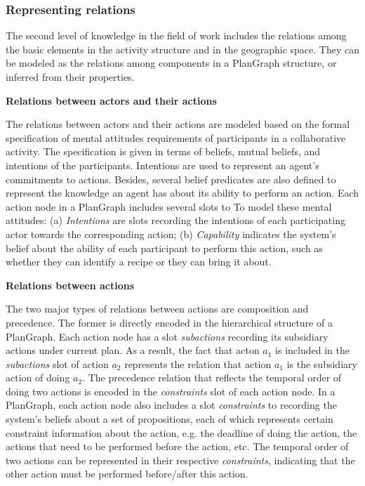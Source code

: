 \subsubsection{Representing relations} %
\label{ssub:representing_relations}
The second level of knowledge in the field of work includes the relations among the basic elements in the activity structure and in the geographic space. They can be modeled as the relations among components in a PlanGraph structure, or inferred from their properties.

\textbf{Relations between actors and their actions}

The relations between actors and their actions are modeled based on the formal specification of mental attitudes requirements of participants in a collaborative activity. The specification is given in terms of beliefs, mutual beliefs, and intentions of the participants. Intentions are used to represent an agent’s commitments to actions. Besides, several belief predicates are also defined to represent the knowledge an agent has about its ability to perform an action. Each action node in a PlanGraph includes several slots to To model these mental attitudes: (a) \emph{Intentions} are slots recording the intentions of each participating actor towards the corresponding action; (b) \emph{Capability} indicates the system’s belief about the ability of each participant to perform this action, such as whether they can identify a recipe or they can bring it about.

\textbf{Relations between actions}

The two major types of relations between actions are composition and precedence. The former is directly encoded in the hierarchical structure of a PlanGraph. Each action node has a slot \emph{subactions} recording its subsidiary actions under current plan. As a result, the fact that acton $a_1$ is included in the \emph{subactions} slot of action $a_2$ represents the relation that action $a_1$ is the subsidiary action of doing $a_2$. The precedence relation that reflects the temporal order of doing two actions is encoded in the \emph{constraints} slot of each action node. In a PlanGraph, each action node also includes a slot \emph{constraints} to recording the system’s beliefs about a set of propositions, each of which represents certain constraint information about the action, e.g. the deadline of doing the action, the actions that need to be performed before the action, etc. The temporal order of two actions can be represented in their respective \emph{constraints}, indicating that the other action must be performed before/after this action.

